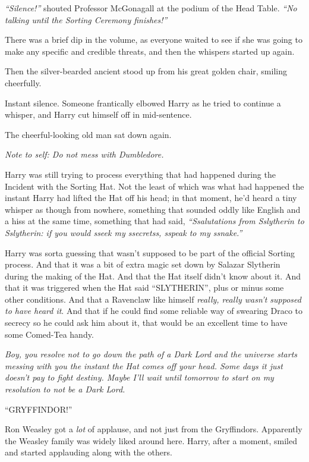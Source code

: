 \emph{``Silence!''} shouted Professor McGonagall at the podium of the
Head Table. \emph{``No talking until the Sorting Ceremony finishes!''}

There was a brief dip in the volume, as everyone waited to see if she
was going to make any specific and credible threats, and then the
whispers started up again.

Then the silver-bearded ancient stood up from his great golden chair,
smiling cheerfully.

Instant silence. Someone frantically elbowed Harry as he tried to
continue a whisper, and Harry cut himself off in mid-sentence.

The cheerful-looking old man sat down again.

\emph{Note to self: Do not mess with Dumbledore.}

Harry was still trying to process everything that had happened during
the Incident with the Sorting Hat. Not the least of which was what had
happened the instant Harry had lifted the Hat off his head; in that
moment, he'd heard a tiny whisper as though from nowhere, something that
sounded oddly like English and a hiss at the same time, something that
had said, \emph{``Ssalutations from Sslytherin to Sslytherin: if you
would sseek my ssecretss, sspeak to my ssnake.''}

Harry was sorta guessing that wasn't supposed to be part of the official
Sorting process. And that it was a bit of extra magic set down by
Salazar Slytherin during the making of the Hat. And that the Hat itself
didn't know about it. And that it was triggered when the Hat said
``SLYTHERIN'', plus or minus some other conditions. And that a Ravenclaw
like himself \emph{really, really wasn't supposed to have heard it}. And
that if he could find some reliable way of swearing Draco to secrecy so
he could ask him about it, that would be an excellent time to have some
Comed-Tea handy.

\emph{Boy, you resolve not to go down the path of a Dark Lord and the
universe starts messing with you the instant the Hat comes off your
head. Some days it just doesn't pay to fight destiny. Maybe I'll wait
until tomorrow to start on my resolution to not be a Dark Lord.}

``GRYFFINDOR!''

Ron Weasley got a \emph{lot} of applause, and not just from the
Gryffindors. Apparently the Weasley family was widely liked around here.
Harry, after a moment, smiled and started applauding along with the
others.

